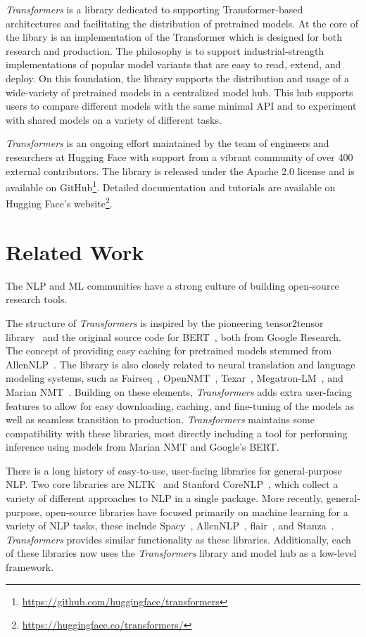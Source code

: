 \textit{Transformers} is a library dedicated to supporting Transformer-based architectures and facilitating the distribution of pretrained models. At the core of the libary is an implementation of the Transformer which is designed for both research and production. The philosophy is to support industrial-strength implementations of popular model variants that are easy to read, extend, and deploy. On this foundation, the library supports the distribution and usage of a wide-variety of pretrained models in a centralized model hub. This hub supports users to compare different models with the same minimal API and to experiment with shared models on a variety of different tasks.  

\textit{Transformers} is an ongoing effort maintained by the team of engineers and researchers at Hugging Face with support from a vibrant community of over 400 external contributors. The library is released under the Apache 2.0 license and is available on GitHub\footnote{\url{https://github.com/huggingface/transformers}}. Detailed documentation and tutorials are available on Hugging Face's website\footnote{\url{https://huggingface.co/transformers/}}.

\section{Related Work}

The NLP and ML communities have a strong culture of building open-source research tools.  

The structure of \textit{Transformers} is inspired by the pioneering tensor2tensor library~\citep{tensor2tensor} and the original source code for BERT~\citep{Devlin2018-gk}, both from Google Research. The concept of providing easy caching for pretrained models stemmed from AllenNLP~\cite{Gardner2018-tg}. The library is also closely related to neural translation and language modeling systems, such as Fairseq~\cite{Ott2019-pi},  OpenNMT~\cite{klein-etal-2017-opennmt}, Texar~\cite{Hu2018-xj}, Megatron-LM~\cite{shoeybi2019megatron}, and Marian NMT~\cite{Junczys-Dowmunt2018-xq}. Building on these elements, \textit{Transformers} adds extra user-facing features to allow for easy downloading, caching, and fine-tuning of the models as well as seamless transition to production. \textit{Transformers} maintains some compatibility with these libraries, most directly including a tool for performing inference using models from Marian NMT and Google's BERT.

There is a long history of easy-to-use, user-facing libraries for general-purpose NLP. Two core libraries are NLTK~\cite{Loper2002-xd} and Stanford CoreNLP~\cite{Manning2014-pc}, which collect a variety of different approaches to NLP in a single package. More recently, general-purpose, open-source libraries have focused primarily on machine learning for a variety of NLP tasks, these include Spacy~\cite{Honnibal2017-bx}, AllenNLP~\cite{Gardner2018-tg}, flair~\cite{Akbik2019-ch}, and Stanza~\cite{Qi2020-he}. \textit{Transformers} provides similar functionality as these libraries. Additionally, each of these libraries now uses the \textit{Transformers} library and model hub as a low-level framework.

